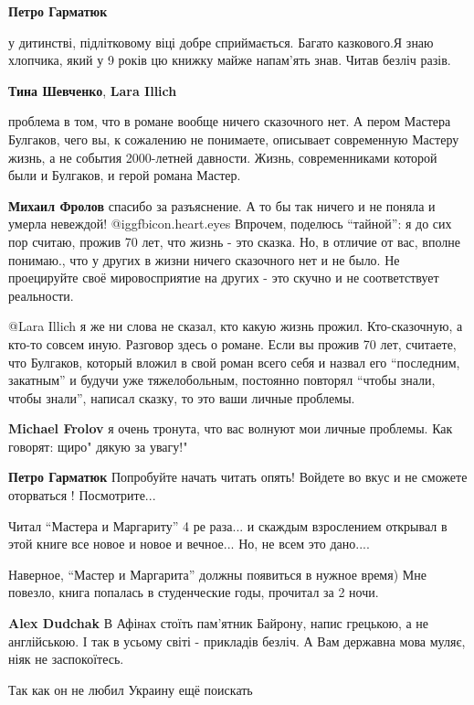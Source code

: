 \begin{itemize}
\begin{itemize}
\textbf{Петро Гарматюк} 

у дитинстві, підлітковому віці добре сприймається. Багато казкового.Я знаю
хлопчика, який у 9 років цю книжку майже напам'ять знав. Читав безліч разів.


\textbf{Тина Шевченко}, \textbf{Lara Illich} 

проблема в том, что в романе вообще ничего сказочного нет. А пером Мастера
Булгаков, чего вы, к сожалению не понимаете, описывает современную Мастеру
жизнь, а не события 2000-летней давности. Жизнь, современниками которой были и
Булгаков, и герой романа Мастер.

\begin{itemize} %
\textbf{Михаил Фролов} спасибо за разъяснение. А то бы так ничего и не поняла и умерла невеждой! @igg{fbicon.heart.eyes} 
Впрочем, поделюсь \enquote{тайной}: я до сих пор считаю, прожив 70 лет, что жизнь - это сказка. Но, в отличие от вас, вполне понимаю., что у других в жизни ничего сказочного нет и не было.
Не проецируйте своё мировосприятие на других - это скучно и не соответствует реальности.
\end{itemize} %


@Lara Illich я же ни слова не сказал, кто какую жизнь прожил. Кто-сказочную, а
кто-то совсем иную. Разговор здесь о романе. Если вы прожив 70 лет, считаете,
что Булгаков, который вложил в свой роман всего себя и назвал его \enquote{последним,
закатным} и будучи уже тяжелобольным, постоянно повторял \enquote{чтобы знали, чтобы
знали}, написал сказку, то это ваши личные проблемы.


\textbf{Michael Frolov} я очень тронута, что вас волнуют мои личные проблемы. Как говорят: щиро" дякую за увагу!"

\textbf{Петро Гарматюк} Попробуйте начать читать опять! Войдете во вкус и не сможете оторваться ! Посмотрите...


Читал \enquote{Мастера и Маргариту} 4 ре раза... и скаждым взрослением открывал в этой
книге все новое и новое и вечное... Но, не всем это дано....

\end{itemize} %

Наверное, \enquote{Мастер и Маргарита} должны появиться в нужное время) Мне
повезло, книга попалась в студенческие годы, прочитал за 2 ночи.

\textbf{Alex Dudchak} В Афінах стоїть пам'ятник Байрону, напис грецькою, а не англійською. І так в усьому світі - прикладів безліч. А Вам державна мова муляє, ніяк не заспокоїтесь.

Так как он не любил Украину ещё поискать

\end{itemize} %
